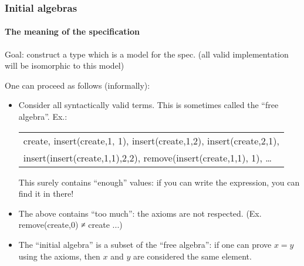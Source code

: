 \documentclass{beamer}
\begin{document}
\begin{frame}[fragile]
\frametitle{Initial algebras}
\framesubtitle{The meaning of the specification}
Goal: construct a type which is a model for the spec. 
(all valid implementation will be isomorphic to this model)
\vfill

One can proceed as follows (informally):
\begin{itemize}
\item Consider all syntactically valid terms. This is sometimes
called the ``free algebra''.
Ex.:
\\
\hspace*{0.5cm}
{\small\em
\begin{tabular}{l}
create, insert(create,1, 1), 
insert(create,1,2), insert(create,2,1),\\
insert(insert(create,1,1),2,2), remove(insert(create,1,1), 1), \ldots
\end{tabular}
}
This surely contains ``enough'' values: if you can write the expression, you
can find it in there!

\item The above contains ``too much'': the axioms are not respected.
(Ex. remove(create,0) ≠ create ...) 

\item The ``initial algebra'' is a subset of the ``free algebra'':
  if one can prove $x=y$ using the axioms, then $x$ and $y$ are
  considered the same element.
\end{itemize}
\end{frame}

\end{document}
